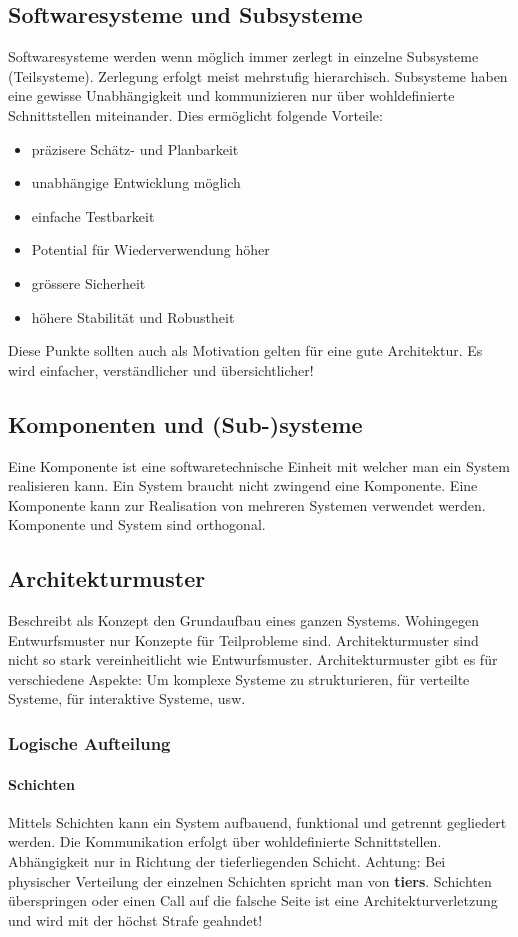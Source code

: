 \subsection{Softwaresysteme und Subsysteme}
Softwaresysteme werden wenn möglich immer zerlegt in einzelne Subsysteme (Teilsysteme). Zerlegung erfolgt meist mehrstufig hierarchisch. Subsysteme haben eine gewisse Unabhängigkeit und kommunizieren nur über wohldefinierte Schnittstellen miteinander. Dies ermöglicht folgende Vorteile:
\begin{itemize}
	\item präzisere Schätz- und Planbarkeit
	\item unabhängige Entwicklung möglich
	\item einfache Testbarkeit
	\item Potential für Wiederverwendung höher
	\item grössere Sicherheit
	\item höhere Stabilität und Robustheit
\end{itemize}
Diese Punkte sollten auch als Motivation gelten für eine gute Architektur. Es wird einfacher, verständlicher und übersichtlicher!

\subsection{Komponenten und (Sub-)systeme}
Eine Komponente ist eine softwaretechnische Einheit mit welcher man ein System realisieren kann. Ein System braucht nicht zwingend eine Komponente. Eine Komponente kann zur Realisation von mehreren Systemen verwendet werden. Komponente und System sind orthogonal.

\subsection{Architekturmuster}
Beschreibt als Konzept den Grundaufbau eines ganzen Systems. Wohingegen Entwurfsmuster nur Konzepte für Teilprobleme sind. Architekturmuster sind nicht so stark vereinheitlicht wie Entwurfsmuster. Architekturmuster gibt es für verschiedene Aspekte: Um komplexe Systeme zu strukturieren, für verteilte Systeme, für interaktive Systeme, usw.

\subsubsection{Logische Aufteilung}

\paragraph{Schichten} Mittels Schichten kann ein System aufbauend, funktional und getrennt gegliedert werden. Die Kommunikation erfolgt über wohldefinierte Schnittstellen. Abhängigkeit nur in Richtung der tieferliegenden Schicht. Achtung: Bei physischer Verteilung der einzelnen Schichten spricht man von \textbf{tiers}.
Schichten überspringen oder einen Call auf die falsche Seite ist eine Architekturverletzung und wird mit der höchst Strafe geahndet!

